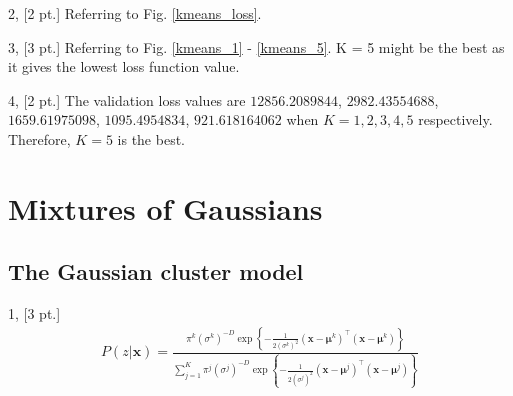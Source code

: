 \documentclass[12pt,letterpaper]{article}
\begin{document}
2, [2 pt.] Referring to Fig. \ref{kmeans_loss}.

3, [3 pt.] Referring to Fig. \ref{kmeans_1} - \ref{kmeans_5}. K = 5 might be the best as it gives the lowest loss function value.

4, [2 pt.] The validation loss values are $12856.2089844$, $2982.43554688$, $1659.61975098$, $1095.4954834$, $921.618164062$ when $K = 1, 2, 3, 4, 5$ respectively. Therefore, $K = 5$ is the best.


\section{Mixtures of Gaussians}

\subsection{The Gaussian cluster model}

1, [3 pt.] 
\begin{align}
P(z | \mathbf{x}) = \frac{ \pi^{k} \left( \sigma^{k} \right)^{-D} \exp \left\{ -\frac{1}{2 \left( \sigma^{k} \right)^{2}} (\mathbf{x} - \bm{\mu}^{k})^{\top} (\mathbf{x} - \bm{\mu}^{k}) \right\} }{ \sum_{j=1}^{K} \pi^{j} \left( \sigma^{j} \right)^{-D} \exp \left\{ -\frac{1}{2 \left( \sigma^{j} \right)^{2}} (\mathbf{x} - \bm{\mu}^{j})^{\top} (\mathbf{x} - \bm{\mu}^{j}) \right\} }
\label{GMM_posterior}
\end{align}
\end{document}
